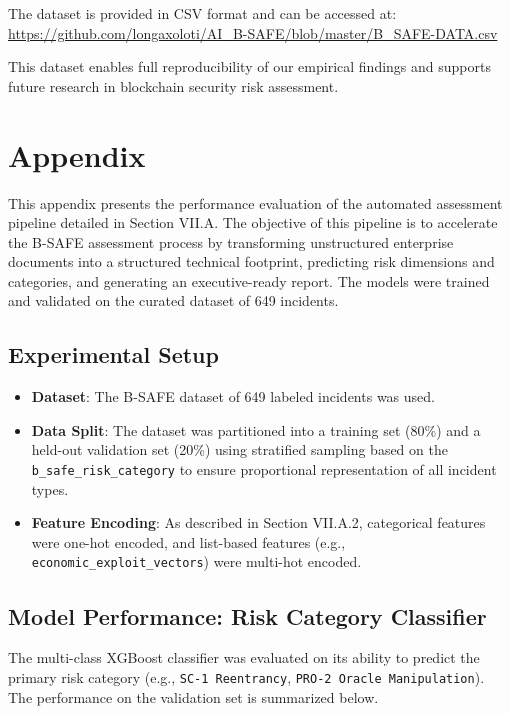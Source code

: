 \documentclass[a4paper]{article}
\begin{document}
\begin{multicols}{2}
The dataset is provided in CSV format and can be accessed at:
\url{https://github.com/longaxoloti/AI_B-SAFE/blob/master/B_SAFE-DATA.csv}

This dataset enables full reproducibility of our empirical findings and supports future research in blockchain security risk assessment.



\newpage
\appendix
\section*{Appendix}
\label{appendix:pipeline_evaluation}

This appendix presents the performance evaluation of the automated assessment pipeline detailed in Section VII.A. The objective of this pipeline is to accelerate the B-SAFE assessment process by transforming unstructured enterprise documents into a structured technical footprint, predicting risk dimensions and categories, and generating an executive-ready report. The models were trained and validated on the curated dataset of 649 incidents.

\subsection{Experimental Setup}

\begin{itemize}
    \item \textbf{Dataset}: The B-SAFE dataset of 649 labeled incidents was used.
    \item \textbf{Data Split}: The dataset was partitioned into a training set (80\%) and a held-out validation set (20\%) using stratified sampling based on the \texttt{b\_safe\_risk\_category} to ensure proportional representation of all incident types.
    \item \textbf{Feature Encoding}: As described in Section VII.A.2, categorical features were one-hot encoded, and list-based features (e.g., \texttt{economic\_exploit\_vectors}) were multi-hot encoded.
\end{itemize}

\subsection{Model Performance: Risk Category Classifier}

The multi-class XGBoost classifier was evaluated on its ability to predict the primary risk category (e.g., \texttt{SC-1 Reentrancy}, \texttt{PRO-2 Oracle Manipulation}). The performance on the validation set is summarized below.


\end{multicols}
\end{document}
